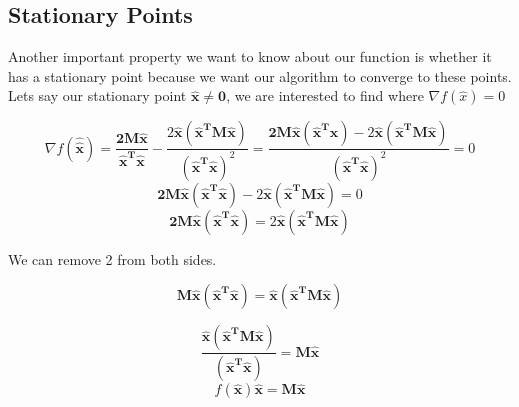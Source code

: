 \documentclass{article}
\numberwithin{equation}{section}
\begin{document}
\subsection{Stationary Points}

Another important property we want to know about our function is whether it has a stationary point because we want our algorithm to converge to these points. Lets say our stationary point $\boldsymbol{\hat{x} \neq 0}$, we are interested to find where $\nabla f(\hat{x}) = 0$


\begin{equation}
    \nabla f(\hat{\hat{\boldsymbol{x}}})= \frac{ \boldsymbol{2M\hat{\boldsymbol{x}}}}{ \boldsymbol{\hat{\boldsymbol{x}}^T\hat{\boldsymbol{x}}}} - \frac{2 \hat{\boldsymbol{x}}( \boldsymbol{\hat{\boldsymbol{x}}^T M \hat{\boldsymbol{x}}})}{(\boldsymbol{\hat{\boldsymbol{x}}^T\hat{\boldsymbol{x}}})^2}=\frac{\boldsymbol{2M\hat{\boldsymbol{x}}}(\boldsymbol{\hat{\boldsymbol{x}}^T\hat{\boldsymbol{x}}}) -  2 \hat{\boldsymbol{x}}( \boldsymbol{\hat{\boldsymbol{x}}^T M \hat{\boldsymbol{x}}})}{(\boldsymbol{\hat{\boldsymbol{x}}^T\hat{\boldsymbol{x}}})^2}=0
\end{equation}
\begin{equation}
    \boldsymbol{2M\hat{\boldsymbol{x}}}(\boldsymbol{\hat{\boldsymbol{x}}^T\hat{\boldsymbol{x}}}) -  2 \hat{\boldsymbol{x}}( \boldsymbol{\hat{\boldsymbol{x}}^T M \hat{\boldsymbol{x}}})=0
\end{equation}
\begin{equation}
    \boldsymbol{2M\hat{\boldsymbol{x}}}(\boldsymbol{\hat{\boldsymbol{x}}^T\hat{\boldsymbol{x}}}) = 2 \boldsymbol{\hat{\boldsymbol{x}}}( \boldsymbol{\hat{\boldsymbol{x}}^T M \hat{\boldsymbol{x}}})
\end{equation}

We can remove 2 from both sides.

\begin{equation}
    \boldsymbol{M\hat{\boldsymbol{x}}}(\boldsymbol{\hat{\boldsymbol{x}}^T\hat{\boldsymbol{x}}}) =  \boldsymbol{\hat{\boldsymbol{x}}}( \boldsymbol{\hat{\boldsymbol{x}}^T M \hat{\boldsymbol{x}}})
\end{equation}

\begin{equation}
    \frac{ \boldsymbol{\hat{\boldsymbol{x}}}( \boldsymbol{\hat{\boldsymbol{x}}^T M \hat{\boldsymbol{x}}})}{(\boldsymbol{\hat{\boldsymbol{x}}^T\hat{\boldsymbol{x}}})} = \boldsymbol{M\hat{\boldsymbol{x}}}
\end{equation}
\begin{equation}
     f(\boldsymbol{\hat{\boldsymbol{x}}})\boldsymbol{\hat{\boldsymbol{x}}} = \boldsymbol{M\hat{\boldsymbol{x}}}
\end{equation}
\end{document}
